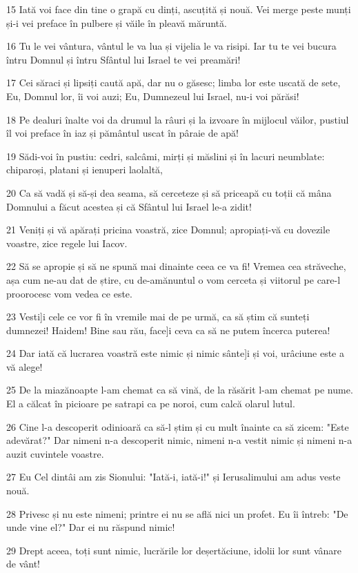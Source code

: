 \par 15 Iată voi face din tine o grapă cu dinți, ascuțită și nouă. Vei merge peste munți și-i vei preface în pulbere și văile în pleavă măruntă.
\par 16 Tu le vei vântura, vântul le va lua și vijelia le va risipi. Iar tu te vei bucura întru Domnul și întru Sfântul lui Israel te vei preamări!
\par 17 Cei săraci și lipsiți caută apă, dar nu o găsesc; limba lor este uscată de sete, Eu, Domnul lor, îi voi auzi; Eu, Dumnezeul lui Israel, nu-i voi părăsi!
\par 18 Pe dealuri înalte voi da drumul la râuri și la izvoare în mijlocul văilor, pustiul îl voi preface în iaz și pământul uscat în pâraie de apă!
\par 19 Sădi-voi în pustiu: cedri, salcâmi, mirți și măslini și în lacuri neumblate: chiparoși, platani și ienuperi laolaltă,
\par 20 Ca să vadă și să-și dea seama, să cerceteze și să priceapă cu toții că mâna Domnului a făcut acestea și că Sfântul lui Israel le-a zidit!
\par 21 Veniți și vă apărați pricina voastră, zice Domnul; apropiați-vă cu dovezile voastre, zice regele lui Iacov.
\par 22 Să se apropie și să ne spună mai dinainte ceea ce va fi! Vremea cea străveche, așa cum ne-au dat de știre, cu de-amănuntul o vom cerceta și viitorul pe care-l proorocesc vom vedea ce este.
\par 23 Vesti]i cele ce vor fi în vremile mai de pe urmă, ca să știm că sunteți dumnezei! Haidem! Bine sau rău, face]i ceva ca să ne putem încerca puterea!
\par 24 Dar iată că lucrarea voastră este nimic și nimic sânte]i și voi, urâciune este a vă alege!
\par 25 De la miazănoapte l-am chemat ca să vină, de la răsărit l-am chemat pe nume. El a călcat în picioare pe satrapi ca pe noroi, cum calcă olarul lutul.
\par 26 Cine l-a descoperit odinioară ca să-l știm și cu mult înainte ca să zicem: "Este adevărat?" Dar nimeni n-a descoperit nimic, nimeni n-a vestit nimic și nimeni n-a auzit cuvintele voastre.
\par 27 Eu Cel dintâi am zis Sionului: "Iată-i, iată-i!" și Ierusalimului am adus veste nouă.
\par 28 Privesc și nu este nimeni; printre ei nu se află nici un profet. Eu îi întreb: "De unde vine el?" Dar ei nu răspund nimic!
\par 29 Drept aceea, toți sunt nimic, lucrările lor deșertăciune, idolii lor sunt vânare de vânt!

